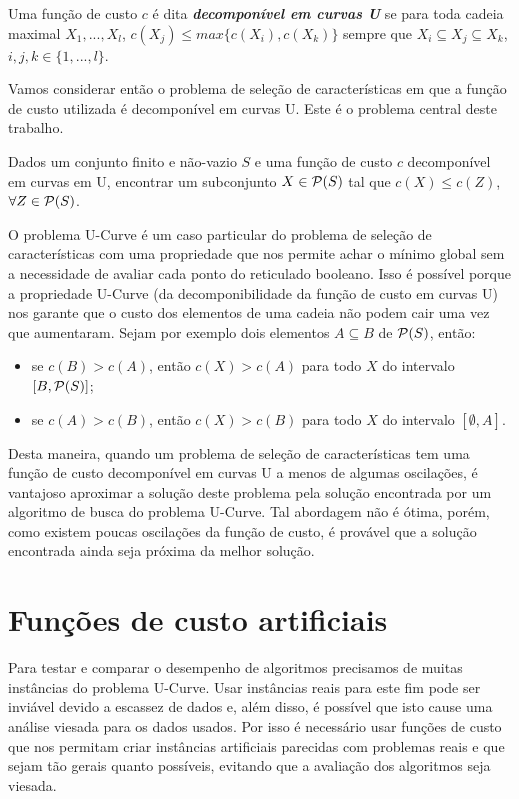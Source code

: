 \begin{mydefinition}\label{fund_concepts:ushape}
Uma função de custo $c$ é dita {\bf \em decomponível em curvas U} se
para toda cadeia maximal $X_1, ..., X_l$, $c(X_j) \leq max \{c (X_i),
c (X_k)\}$ sempre que $X_i \subseteq X_j \subseteq X_k$, $i, j, k \in 
\{1, ..., l\}$.
\end{mydefinition}

Vamos considerar então o problema de seleção de características em que a
função de custo utilizada é decomponível em curvas U. Este é o problema 
central deste trabalho.

\begin{mydefinition}
Dados um conjunto finito e não-vazio $S$ e uma função de custo $c$ 
decomponível em curvas em U, encontrar um subconjunto $X \in 
\mathcal{P} (S)$ tal que $c(X) \leq c(Z)$,  $\forall Z \in \mathcal{P} (S)$.
\end{mydefinition}

O problema U-Curve é um caso particular do problema de seleção de 
características com uma propriedade que nos permite achar o mínimo
global sem a necessidade de avaliar cada ponto do reticulado booleano. 
Isso é possível porque a propriedade U-Curve (da decomponibilidade da 
função de custo em curvas U) nos garante que o custo dos elementos de 
uma cadeia não podem cair uma vez que aumentaram. Sejam por exemplo
dois elementos $A \subseteq B$ de $\mathcal{P} (S)$, então:
\begin{itemize}
    \item{se $c(B) > c (A)$, então $c (X) > c (A)$ para todo $X$
        do intervalo $[B, \mathcal{P} (S)]$;}
    \item{se $c(A) > c (B)$, então $c (X) > c (B)$ para todo $X$ 
        do intervalo $[\emptyset, A]$.}
\end{itemize}

Desta maneira, quando um problema de seleção de características tem uma 
função de custo decomponível em curvas U a menos de algumas oscilações,
é vantajoso aproximar a solução deste problema pela solução encontrada
por um algoritmo de busca do problema U-Curve. Tal abordagem não é 
ótima, porém, como existem poucas oscilações da função de custo, é 
provável que a solução encontrada ainda seja próxima da melhor solução.

\section{Funções de custo artificiais}
Para testar e comparar o desempenho de algoritmos precisamos de muitas 
instâncias do problema U-Curve. Usar instâncias reais para este fim pode
ser inviável devido a escassez de dados e, além disso, é possível que 
isto cause uma análise viesada para os dados usados. Por isso é 
necessário usar funções de custo que nos permitam criar instâncias 
artificiais parecidas com problemas reais e que sejam tão gerais quanto 
possíveis, evitando que a avaliação dos algoritmos seja viesada. 

